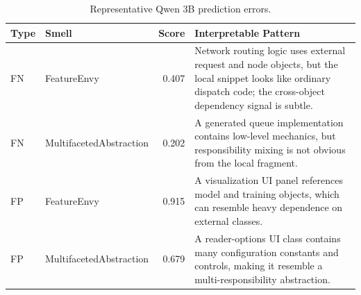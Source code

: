 \begin{table}[H]
\centering
\footnotesize
\begin{tabular}{@{}llrP{0.50\textwidth}@{}}
\toprule
Type & Smell & Score & Interpretable Pattern \\
\midrule
FN & FeatureEnvy & 0.407 & Network routing logic uses external request and node objects, but the local snippet looks like ordinary dispatch code; the cross-object dependency signal is subtle. \\
FN & MultifacetedAbstraction & 0.202 & A generated queue implementation contains low-level mechanics, but responsibility mixing is not obvious from the local fragment. \\
FP & FeatureEnvy & 0.915 & A visualization UI panel references model and training objects, which can resemble heavy dependence on external classes. \\
FP & MultifacetedAbstraction & 0.679 & A reader-options UI class contains many configuration constants and controls, making it resemble a multi-responsibility abstraction. \\
\bottomrule
\end{tabular}
\caption{Representative Qwen 3B prediction errors.}
\label{tab:qwen-error-examples}
\end{table}
